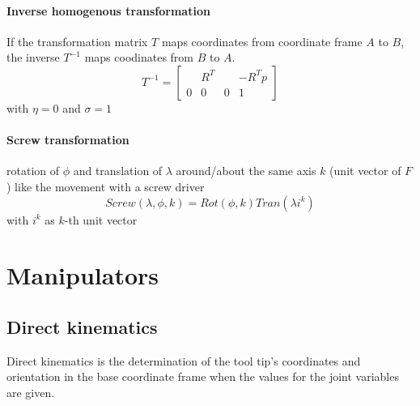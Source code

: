\documentclass[12pt]{article}
\begin{document}
	
	\paragraph{Inverse homogenous transformation} If the transformation matrix $T$ maps coordinates from coordinate frame $A$ to $B$, the inverse $T^{-1}$ maps coodinates from $B$ to $A$.
	\begin{equation}
	T^{-1} = 
	\begin{bmatrix}
	& R^T & & -R^T p\\
	0 & 0 & 0 & 1
	\end{bmatrix}
	\end{equation}
	with $\eta = 0$ and $\sigma = 1$
	
	\paragraph{Screw transformation} rotation of $\phi$ and translation of $\lambda$ around/about the same axis $k$ (unit vector of $F$) like the movement with a screw driver
	\begin{equation}
	Screw(\lambda,\phi,k) = Rot(\phi , k) Tran(\lambda i^k)
	\end{equation}
	with $i^k$ as $k$-th unit vector
	
	\section{Manipulators}
	\subsection{Direct kinematics}
	Direct kinematics is the determination of the tool tip's coordinates and orientation in the base coordinate frame when the values for the joint variables are given.
\end{document}
